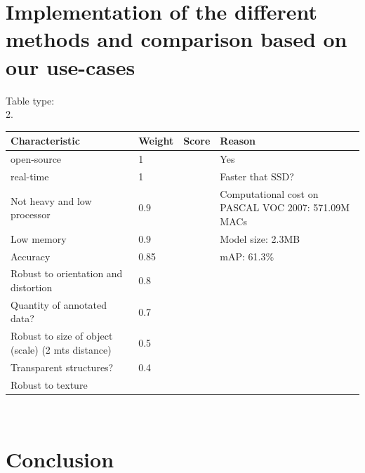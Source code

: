 \documentclass[10pt]{article}
\begin{document}
    \section{Implementation of the different methods and comparison based on our use-cases}
Table type:\\
2. 
\begin{tabular}{ ||p{3cm}|p{1cm}|p{1cm}|p{9cm}||  }
\hline
Characteristic & Weight & Score & Reason \\
\hline
open-source &1& &Yes\\
\hline
real-time	&1 &	&Faster that SSD?\\
\hline
Not heavy and low processor	&0.9 & &Computational cost on PASCAL VOC 2007: 571.09M MACs\\
\hline
Low memory	&0.9& &Model size: 2.3MB \\
\hline
Accuracy	&0.85	&  &mAP: 61.3\% \\
\hline
Robust to orientation  and distortion	&0.8 & & \\
\hline
Quantity of annotated data? &0.7 & & \\
\hline
Robust to size of object (scale) (2 mts distance) &	0.5	& & \\
\hline
Transparent structures?	&0.4& & \\		
\hline
Robust to texture & & & \\
\hline
\end{tabular}\\ 
    \section{Conclusion}
    
    \newpage
    \printbibliography
    
    
    \newpage
    \listoftables
    \listoffigures
    \clearpage
    
    \printglossaries
\end{document}
